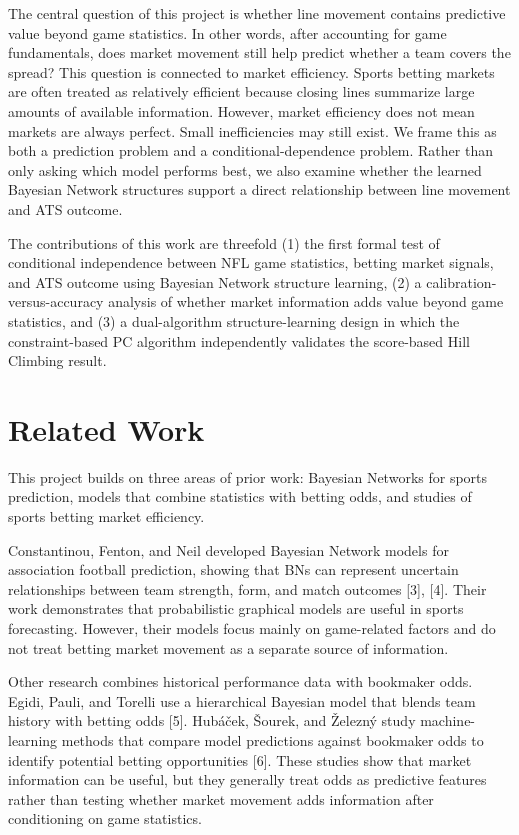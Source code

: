 \documentclass[letterpaper]{article}
\begin{document}
The central question of this project is whether line movement contains predictive value beyond game statistics. In other words, after accounting for game fundamentals, does market movement still help predict whether a team covers the spread? This question is connected to market efficiency. Sports betting markets are often treated as relatively efficient because closing lines summarize large amounts of available information. However, market efficiency does not mean markets are always perfect. Small inefficiencies may still exist. We frame this as both a prediction problem and a conditional-dependence problem. Rather than only asking which model performs best, we also examine whether the learned Bayesian Network structures support a direct relationship between line movement and ATS outcome.  

The contributions of this work are threefold (1) the first formal test of conditional independence between NFL game statistics, betting market signals, and ATS outcome using Bayesian Network structure learning, (2) a calibration-versus-accuracy analysis of whether market information adds value beyond game statistics, and (3) a dual-algorithm structure-learning design in which the constraint-based PC algorithm independently validates the score-based Hill Climbing result. 


\section{Related Work}

This project builds on three areas of prior work: Bayesian Networks for sports prediction, models that combine statistics with betting odds, and studies of sports betting market efficiency. 

Constantinou, Fenton, and Neil developed Bayesian Network models for association football prediction, showing that BNs can represent uncertain relationships between team strength, form, and match outcomes [3], [4]. Their work demonstrates that probabilistic graphical models are useful in sports forecasting. However, their models focus mainly on game-related factors and do not treat betting market movement as a separate source of information. 

Other research combines historical performance data with bookmaker odds. Egidi, Pauli, and Torelli use a hierarchical Bayesian model that blends team history with betting odds [5]. Hubáček, Šourek, and Železný study machine-learning methods that compare model predictions against bookmaker odds to identify potential betting opportunities [6]. These studies show that market information can be useful, but they generally treat odds as predictive features rather than testing whether market movement adds information after conditioning on game statistics. 
\end{document}
